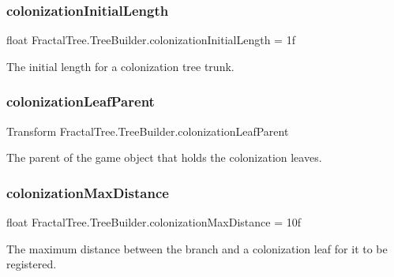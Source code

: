 \subsubsection{\texorpdfstring{colonization\+Initial\+Length}{colonizationInitialLength}}
{\footnotesize\ttfamily float Fractal\+Tree.\+Tree\+Builder.\+colonization\+Initial\+Length = 1f}



The initial length for a colonization tree trunk. 

\hypertarget{class_fractal_tree_1_1_tree_builder_a17c8e9ca6955ef3d2eadbf0fc54acfa3}{}\label{class_fractal_tree_1_1_tree_builder_a17c8e9ca6955ef3d2eadbf0fc54acfa3} 
\subsubsection{\texorpdfstring{colonization\+Leaf\+Parent}{colonizationLeafParent}}
{\footnotesize\ttfamily Transform Fractal\+Tree.\+Tree\+Builder.\+colonization\+Leaf\+Parent}



The parent of the game object that holds the colonization leaves. 

\hypertarget{class_fractal_tree_1_1_tree_builder_a21cbebdabadaf5d205a038d20db2f702}{}\label{class_fractal_tree_1_1_tree_builder_a21cbebdabadaf5d205a038d20db2f702} 
\subsubsection{\texorpdfstring{colonization\+Max\+Distance}{colonizationMaxDistance}}
{\footnotesize\ttfamily float Fractal\+Tree.\+Tree\+Builder.\+colonization\+Max\+Distance = 10f}



The maximum distance between the branch and a colonization leaf for it to be registered. 

\hypertarget{class_fractal_tree_1_1_tree_builder_ac7abe13cc887bafe266773e33513d69a}{}\label{class_fractal_tree_1_1_tree_builder_ac7abe13cc887bafe266773e33513d69a} 
